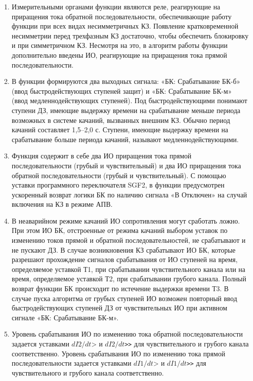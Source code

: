 \begin{enumerate}
\item
Измерительными  органами  функции  являются  реле,  реагирующие  на  приращения  тока обратной последовательности, обеспечивающие работу функции при всех видах несимметричных КЗ. Появление  кратковременной  несимметрии  перед  трехфазным  КЗ  достаточно,  чтобы  обеспечить блокировку  и  при  симметричном  КЗ.  Несмотря  на  это,  в  алгоритм  работы  функции дополнительно введены ИО, реагирующие на приращения тока прямой последовательности.

\item
В  функции  формируются  два  выходных  сигнала:  «БК:  Срабатывание  БК-б»  (ввод быстродействующих ступеней защит) и «БК: Срабатывание БК-м» (ввод медленнодействующих ступеней). Под быстродействующими понимают ступени ДЗ, имеющие выдержку времени на срабатывание меньше периода возможных в системе качаний, вызванных внешним КЗ. Обычно период качаний составляет 1,5–2,0 с.  Ступени,  имеющие  выдержку  времени  на  срабатывание  больше  периода  качаний,  называют медленнодействующими. 

\item
Функция  содержит  в  себе  два  ИО  приращения  тока  прямой  последовательности  (грубый  и чувствительный) и два ИО приращения тока обратной последовательности (грубый и чувствительный). С помощью уставки программного переключателя SGF2, в функции предусмотрен ускоренный возврат логики БК по наличию сигнала «В Отключен» на случай включения на КЗ в режиме АПВ. 

\item
В  неаварийном  режиме  качаний  ИО  сопротивления  могут  сработать  ложно.  При  этом  ИО  БК, отстроенные  от  режима  качаний  выбором  уставок  по  изменению  токов  прямой  и  обратной последовательностей, не срабатывают и не пускают ДЗ. В случае возникновения КЗ срабатывают ИО БК, которые  разрешают  прохождение  сигналов  срабатывания  от  ИО  ступеней  на  время,  определяемое уставкой  Т1,  при  срабатывании  чувствительного  канала  или  на  время,  определяемое  уставкой  Т2,  при срабатывании грубого канала. Полный возврат функции БК происходит по истечение выдержки времени Т3.  В  случае  пуска  алгоритма  от  грубых  ступеней  ИО  возможен  повторный  ввод быстродействующих ступеней ДЗ от чувствительных ИО при активном сигнале «БК: Срабатывание БК-м».

\item 
Уровень  срабатывания  ИО  по  изменению  тока  обратной  последовательности  задается  уставками $dI2/dt$> и $dI2/dt$\verb|>>|  для чувствительного и грубого канала соответственно. Уровень срабатывания ИО по изменению  тока  прямой  последовательности  задается  уставками  $dI1/dt$> и $dI1/dt$\verb|>>|  для чувствительного и грубого канала соответственно. 


\end{enumerate}
